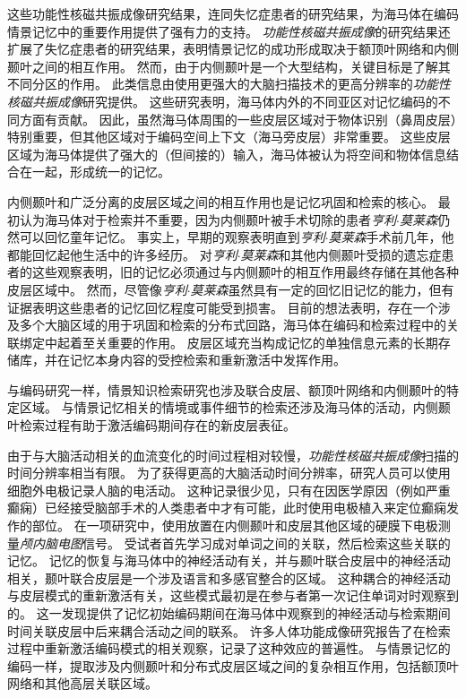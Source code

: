 这些功能性核磁共振成像研究结果，连同失忆症患者的研究结果，为海马体在编码情景记忆中的重要作用提供了强有力的支持。
\textit{功能性核磁共振成像}的研究结果还扩展了失忆症患者的研究结果，表明情景记忆的成功形成取决于额顶叶网络和内侧颞叶之间的相互作用。
然而，由于内侧颞叶是一个大型结构，关键目标是了解其不同分区的作用。
此类信息由使用更强大的大脑扫描技术的更高分辨率的\textit{功能性核磁共振成像}研究提供。
这些研究表明，海马体内外的不同亚区对记忆编码的不同方面有贡献。
因此，虽然海马体周围的一些皮层区域对于物体识别（鼻周皮层）特别重要，但其他区域对于编码空间上下文（海马旁皮层）非常重要。
这些皮层区域为海马体提供了强大的（但间接的）输入，海马体被认为将空间和物体信息结合在一起，形成统一的记忆。


内侧颞叶和广泛分离的皮层区域之间的相互作用也是记忆巩固和检索的核心。
最初认为海马体对于检索并不重要，因为内侧颞叶被手术切除的患者\textit{亨利$\cdot$莫莱森}仍然可以回忆童年记忆。
事实上，早期的观察表明直到\textit{亨利$\cdot$莫莱森}手术前几年，他都能回忆起他生活中的许多经历。
对\textit{亨利$\cdot$莫莱森}和其他内侧颞叶受损的遗忘症患者的这些观察表明，旧的记忆必须通过与内侧颞叶的相互作用最终存储在其他各种皮层区域中。
然而，尽管像\textit{亨利$\cdot$莫莱森}虽然具有一定的回忆旧记忆的能力，但有证据表明这些患者的记忆回忆程度可能受到损害。
目前的想法表明，存在一个涉及多个大脑区域的用于巩固和检索的分布式回路，海马体在编码和检索过程中的关联绑定中起着至关重要的作用。
皮层区域充当构成记忆的单独信息元素的长期存储库，并在记忆本身内容的受控检索和重新激活中发挥作用。


与编码研究一样，情景知识检索研究也涉及联合皮层、额顶叶网络和内侧颞叶的特定区域。
与情景记忆相关的情境或事件细节的检索还涉及海马体的活动，内侧颞叶检索过程有助于激活编码期间存在的新皮层表征。


由于与大脑活动相关的血流变化的时间过程相对较慢，\textit{功能性核磁共振成像}扫描的时间分辨率相当有限。
为了获得更高的大脑活动时间分辨率，研究人员可以使用细胞外电极记录人脑的电活动。
这种记录很少见，只有在因医学原因（例如严重癫痫）已经接受脑部手术的人类患者中才有可能，此时使用电极植入来定位癫痫发作的部位。
在一项研究中，使用放置在内侧颞叶和皮层其他区域的硬膜下电极测量\textit{颅内脑电图}信号。
受试者首先学习成对单词之间的关联，然后检索这些关联的记忆。
记忆的恢复与海马体中的神经活动有关，并与颞叶联合皮层中的神经活动相关，颞叶联合皮层是一个涉及语言和多感官整合的区域。
这种耦合的神经活动与皮层模式的重新激活有关，这些模式最初是在参与者第一次记住单词对时观察到的。
这一发现提供了记忆初始编码期间在海马体中观察到的神经活动与检索期间时间关联皮层中后来耦合活动之间的联系。
许多人体功能成像研究报告了在检索过程中重新激活编码模式的相关观察，记录了这种效应的普遍性。
与情景记忆的编码一样，提取涉及内侧颞叶和分布式皮层区域之间的复杂相互作用，包括额顶叶网络和其他高层关联区域。



